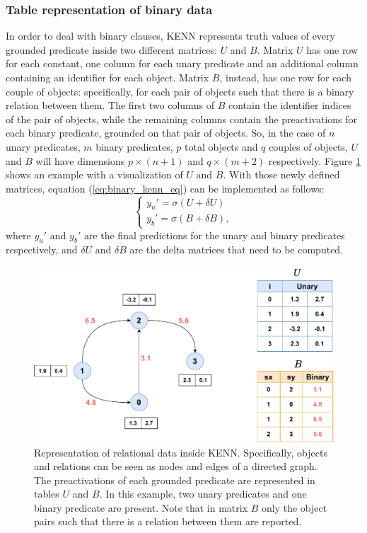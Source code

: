 \subsubsection{Table representation of binary data}

In order to deal with binary clauses, KENN represents truth values of every grounded predicate inside two different matrices: $U$ and $B$. \textcolor{unipd}{Matrix $U$ has one row for each constant}, one column for each unary predicate and an additional column containing an identifier for each object. Matrix $B$, instead, has one row for each couple of objects: specifically, for each pair of objects such that there is a binary relation between them. The first two columns of $B$ contain the identifier indices of the pair of objects, while the remaining columns contain the preactivations for each binary predicate, grounded on that pair of objects. So, in the case of $n$ unary predicates, $m$ binary predicates, $p$ total objects and $q$ couples of objects, $U$ and $B$ will have dimensions $p \times (n+1)$ and $ q \times (m+2)$ respectively. Figure \ref{fig:KENNrelationalrepr} shows an example with a visualization of $U$ and $B$. With those newly defined matrices, equation (\ref{eq:binary_kenn_eq}) can be implemented as follows:
\textcolor{unipd}{\begin{equation*}
	\begin{cases}
	y_u' = \sigma(U+\delta U)\\
	y_b' = \sigma(B + \delta B),
	\end{cases}
	\end{equation*}
	where $y_u'$ and $y_b'$ are the final predictions} for the unary and binary predicates respectively, and $\delta U$ and $\delta B$ are the delta matrices that need to be computed.
 
 \begin{figure}
 	\centering
 	\includegraphics[width=0.7\linewidth]{figures/kenn_relational_representation2.pdf}
 	\caption{Representation of relational data inside KENN. Specifically, objects and relations can be seen as nodes and edges of a directed graph. The preactivations of each grounded predicate are represented in tables $U$ and $B$. In this example, two unary predicates and one binary predicate are present. Note that in matrix $B$ only the object pairs such that there is a relation between them are reported.}
 	\label{fig:KENNrelationalrepr}
 \end{figure}

